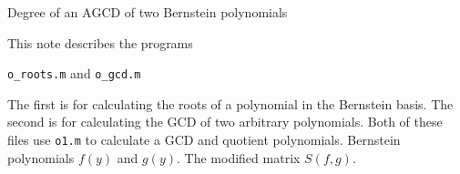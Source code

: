 \documentclass[a4paper,11pt]{article}
\newcommand{\GCD}{\textrm{GCD}}
\newcommand{\AGCD}{\textrm{AGCD}}
\begin{document}
%
\begin{center}
Degree of an $\AGCD$ of two Bernstein polynomials
\end{center}
%
\date{}
%

\hrulefill


\vspace{0.5cm}

This note describes the programs
%
\begin{center}
\texttt{o\_roots.m} and \texttt{o\_gcd.m}
\end{center}
%
The first is for calculating the roots of a polynomial in the Bernstein basis. The second is for calculating the GCD of two arbitrary polynomials. Both of these files use \texttt{o1.m} to calculate a $\GCD$ and quotient polynomials. 
 Bernstein polynomials $f(y)$ and $g(y)$. The modified matrix
$S(f,g)$.
\end{document}
